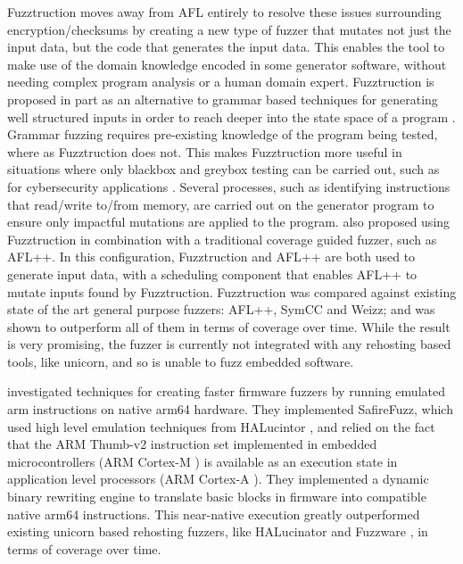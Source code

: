 \documentclass[../report.tex]{subfiles}
\begin{document}
Fuzztruction \citep{Fuzztruction_2023} moves away from AFL entirely to resolve
these issues surrounding encryption/checksums by creating a new type of fuzzer
that mutates not just the input data, but the code that generates the input
data. This enables the tool to make use of the domain knowledge encoded in some
generator software, without needing complex program analysis or a human domain
expert. Fuzztruction is proposed in part as an alternative to grammar based
techniques for generating well structured inputs in order to reach deeper into
the state space of a program \citep{Fuzztruction_2023}. Grammar fuzzing
requires pre-existing knowledge of the program being tested, where as
Fuzztruction does not. This makes Fuzztruction more useful in situations where
only blackbox and greybox testing can be carried out, such as for cybersecurity
applications \citep{Fuzztruction_2023}. Several processes, such as identifying
instructions that read/write to/from memory, are carried out on the generator
program to ensure only impactful mutations are applied to the program.
\citet{Fuzztruction_2023} also proposed using Fuzztruction in combination with
a traditional coverage guided fuzzer, such as AFL++. In this configuration,
Fuzztruction and AFL++ are both used to generate input data, with a scheduling
component that enables AFL++ to mutate inputs found by Fuzztruction.
Fuzztruction was compared against existing state of the art general purpose
fuzzers: AFL++, SymCC and Weizz; and was shown to outperform all of them in
terms of coverage over time. While the result is very promising, the fuzzer is
currently not integrated with any rehosting based tools, like unicorn, and so
is unable to fuzz embedded software.


\citet{Seidel_2023} investigated techniques for creating faster firmware
fuzzers by running emulated arm instructions on native arm64 hardware. They
implemented SafireFuzz, which used high level emulation techniques from
HALucintor \citep{HALucinator_2020}, and relied on the fact that the ARM
Thumb-v2 instruction set implemented in embedded microcontrollers (ARM Cortex-M
\citep{Cortex-M}) is available as an execution state in application level
processors (ARM Cortex-A \citep{Cortex-A}). They implemented a dynamic binary
rewriting engine to translate basic blocks in firmware into compatible native
arm64 instructions. This near-native execution greatly outperformed existing
unicorn based rehosting fuzzers, like HALucinator \citep{HALucinator_2020} and
Fuzzware \citep{Fuzzware_2022}, in terms of coverage over time.
\end{document}
